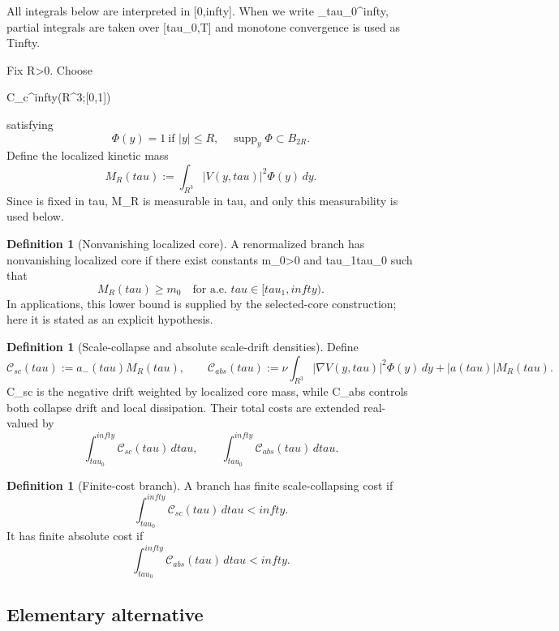 \documentclass[11pt]{amsart}
\def\({}%
\def\){}%
\def\mathrm#1{#1}%
\def\mathbb#1{#1}%
\def\tau{tau}%
\def\infty{infty}%
\theoremstyle{plain}
\theoremstyle{definition}
\newtheorem{definition}[theorem]{Definition}
\theoremstyle{remark}
\begin{document}
All integrals below are interpreted in \([0,\infty]\). When we write
\(\int_{\tau_0}^{\infty}\), partial integrals are taken over \([\tau_0,T]\) and
monotone convergence is used as \(T\to\infty\).

Fix \(R>0\).  Choose
\(
  \Phi\in C_c^\infty(\mathbb R^3;[0,1])
\)
satisfying
\begin{equation}\label{paper5:eq:Phi-properties}
  \Phi(y)=1\ \text{if }|y|\le R,
  \quad
  \operatorname{supp}_y\Phi\subset B_{2R}.
\end{equation}
Define the localized kinetic mass
\[
  M_R(\tau):=\int_{\mathbb R^3}|V(y,\tau)|^2\Phi(y)
  \,dy.
\]
Since \(\Phi\) is fixed in \(\tau\), \(M_R\) is measurable in \(\tau\), and only this
measurability is used below.

\begin{definition}[Nonvanishing localized core]
A renormalized branch has nonvanishing localized core if there exist
constants \(m_0>0\) and \(\tau_1\ge\tau_0\) such that
\[
  M_R(\tau)\ge m_0\quad\text{for a.e. }\tau\in[\tau_1,\infty).
\]
In applications, this lower bound is supplied by the selected-core construction; here it is stated as an explicit hypothesis.
\end{definition}

\begin{definition}[Scale-collapse and absolute scale-drift densities]
Define
\[
  \mathcal C_{\mathrm{sc}}(\tau):=a_-(\tau)M_R(\tau),
  \qquad
  \mathcal C_{\mathrm{abs}}(\tau):=\nu\int_{\mathbb R^3}|\nabla V(y,\tau)|^2\Phi(y)
  \,dy+|a(\tau)|M_R(\tau).
\]
\(\mathcal C_{\mathrm{sc}}\) is the negative drift weighted by localized core mass, while
\(\mathcal C_{\mathrm{abs}}\) controls both collapse drift and local dissipation.
Their total costs are extended real-valued by
\[
  \int_{\tau_0}^{\infty}\mathcal C_{\mathrm{sc}}(\tau)
  \,d\tau,
  \qquad
  \int_{\tau_0}^{\infty}\mathcal C_{\mathrm{abs}}(\tau)
  \,d\tau.
\]
\end{definition}

\begin{definition}[Finite-cost branch]\label{paper5:def:finite-cost-branch}
A branch has finite scale-collapsing cost if
\[
  \int_{\tau_0}^{\infty}\mathcal C_{\mathrm{sc}}(\tau)
  \,d\tau<\infty.
\]
It has finite absolute cost if
\[
  \int_{\tau_0}^{\infty}\mathcal C_{\mathrm{abs}}(\tau)
  \,d\tau<\infty.
\]
\end{definition}

\subsection{Elementary alternative}
\label{paper5:sec:cost}
\end{document}
